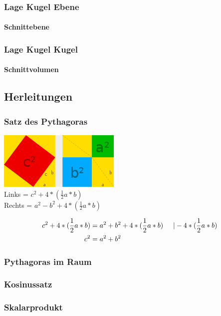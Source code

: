 \documentclass[a4paper]{article} %
\begin{document}
	\subsubsection{Lage Kugel Ebene}
	\paragraph{Schnittebene}
	\subsubsection{Lage Kugel Kugel}
	\paragraph{Schnittvolumen}
	\subsection{Herleitungen}
	\subsubsection{Satz des Pythagoras}
	\includegraphics[width=220 px, height=103 px]{pytha.png}\\
	Links = $c^2+ 4*(\frac{1}{2}a*b)$\\
	Rechts = $a^2-b^2+4*(\frac{1}{2}a*b)$

	\begin{align*}
	c^2+ 4*(\frac{1}{2}a*b) &= a^2+b^2+4*(\frac{1}{2}a*b)  \hspace{0.5 cm} |-4*(\frac{1}{2}a*b)\\
	c^2 &= a^2+b^2
	\end{align*}


	
	
	\subsubsection{Pythagoras im Raum}
	\subsubsection{Kosinussatz}
	\subsubsection{Skalarprodukt}
\end{document}
